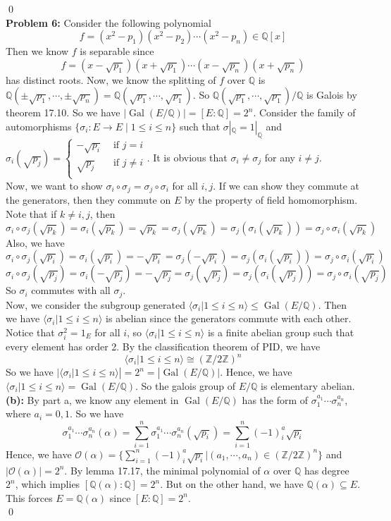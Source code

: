 \documentclass[12pt]{amsart}
\newcommand{\Q}{\mathbb{Q}}
\newcommand{\Z}{\mathbb{Z}}
\newcommand{\Orbit}{\mathcal{O}}
\newcommand{\Gal}[0]{\operatorname{Gal}}
\begin{document}
\qed\\
\textbf{Problem 6:} Consider the following polynomial
\[f=(x^2-p_1)(x^2-p_2)\cdots(x^2-p_n)\in \Q[x]\]
Then we know $f$ is separable since 
\[f=(x-\sqrt{p_1})(x+\sqrt{p_1})\cdots (x-\sqrt{p_n})(x+\sqrt{p_n})\]
has distinct roots. Now, we know the splitting of $f$ over $\Q$ is $\Q(\pm\sqrt{p_1},\cdots,\pm\sqrt{p_n})=\Q(\sqrt{p_1},\cdots,\sqrt{p_1}) $. So $\Q(\sqrt{p_1},\cdots,\sqrt{p_1}) /\Q$ is Galois by theorem 17.10. So we have $|\Gal(E/\Q)|=[E:\Q]=2^n$. 
Consider the family of automorphisms $\{\sigma_i:E\to E\mid 1\leq i\leq n\}$ such that $\sigma|_\Q=1|_\Q$ and $\sigma_i(\sqrt{p_j})=\begin{cases}
    -\sqrt{p_i} &\text{ if } j=i\\
    \sqrt{p_j} &\text{ if } j\neq i\\
\end{cases}$. It is obvious that $\sigma_i\neq \sigma_j$ for any $i\neq j$.\\
Now, we want to show $\sigma_i\circ \sigma_j=\sigma_j\circ \sigma_i$ for all $i,j$. If we can show they commute at the generators, then they commute on $E$ by the property of field homomorphism. Note that if $k\neq i,j$, then 
$$\sigma_i\circ \sigma_j(\sqrt{p_k})=\sigma_i(\sqrt{p_k})=\sqrt{p_k}=\sigma_j(\sqrt{p_k})=\sigma_j(\sigma_i(\sqrt{p_k}))=\sigma_j\circ \sigma_i(\sqrt{p_k})$$
Also, we have 
$$\sigma_i\circ \sigma_j(\sqrt{p_i})=\sigma_i(\sqrt{p_i})=-\sqrt{p_i}=\sigma_j(-\sqrt{p_i})=\sigma_j(\sigma_i(\sqrt{p_i}))=\sigma_j\circ \sigma_i(\sqrt{p_i})$$
$$\sigma_i\circ \sigma_j(\sqrt{p_j})=\sigma_i(-\sqrt{p_j})=-\sqrt{p_j}=\sigma_j(\sqrt{p_j})=\sigma_j(\sigma_i(\sqrt{p_j}))=\sigma_j\circ \sigma_i(\sqrt{p_j})$$
So $\sigma_i$ commutes with all $\sigma_j$.\\
Now, we consider the subgroup generated $\langle\sigma_i|1\leq i\leq n\rangle\leq \Gal(E/\Q)$. Then we have $\langle\sigma_i|1\leq i\leq n\rangle$ is abelian since the generators commute with each other. Notice that $\sigma_i^2=1_E$ for all $i$, so $\langle\sigma_i|1\leq i\leq n\rangle$ is a finite abelian group such that every element has order 2. By the classification theorem of PID, we have  
\[\langle\sigma_i|1\leq i\leq n\rangle\cong(\Z/2\Z)^n\]
So we have $|\langle\sigma_i|1\leq i\leq n\rangle|=2^n=|\Gal(E/\Q)|$. Hence, we have $\langle\sigma_i|1\leq i\leq n\rangle=\Gal(E/\Q)$. So the galois group of $E/\Q$ is elementary abelian.\\
\textbf{(b):} By part a, we know any element in $\Gal(E/\Q)$ has the form of $\sigma_1^{a_1}\cdots\sigma_n^{a_n}$, where $a_i=0,1$. So we have 
\[\sigma_1^{a_1}\cdots\sigma_n^{a_n}(\alpha)=\sum_{i=1}^n\sigma_1^{a_1}\cdots\sigma_n^{a_n}(\sqrt{p_i})=\sum_{i=1}^n(-1)^a_i\sqrt{p_i}\]
Hence, we have $\Orbit(\alpha)=\{\sum_{i=1}^n(-1)^a_i\sqrt{p_i}|(a_1,\cdots,a_n)\in(\Z/2\Z)^n\}$ and $|\Orbit(\alpha)|=2^n$. By lemma 17.17, the minimal polynomial of $\alpha$ over $\Q$ has degree $2^n$, which implies $[\Q(\alpha):\Q]=2^n$. But on the other hand, we have $\Q(\alpha)\subseteq E$. This forces $E=\Q(\alpha)$ since $[E:\Q]=2^n$.
\\\qed\\
\end{document}
